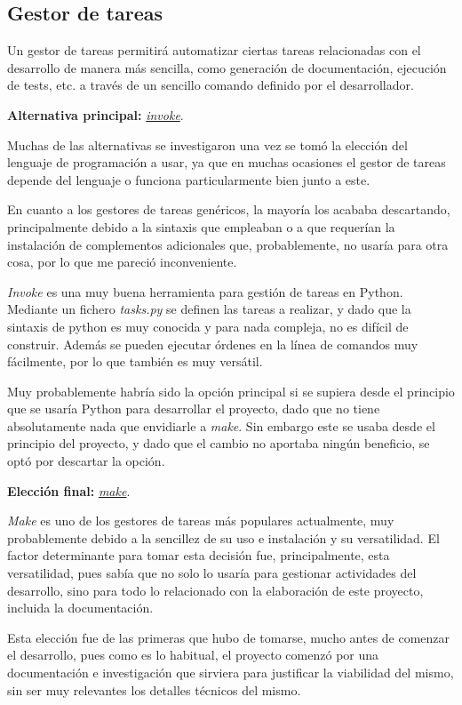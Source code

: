 \subsection{Gestor de tareas}

Un gestor de tareas permitirá automatizar ciertas tareas relacionadas con el desarrollo de manera más sencilla, como generación de documentación, ejecución de tests, etc. a través de un sencillo comando definido por el desarrollador.


\textbf{Alternativa principal:} \href{https://www.pyinvoke.org/}{\textit{invoke}}.

Muchas de las alternativas se investigaron una vez se tomó la elección del lenguaje de programación a usar, ya que en muchas ocasiones el gestor de tareas depende del lenguaje o funciona particularmente bien junto a este. 

En cuanto a los gestores de tareas genéricos, la mayoría los acababa descartando, principalmente debido a la sintaxis que empleaban o a que requerían la instalación de complementos adicionales que, probablemente, no usaría para otra cosa, por lo que me pareció inconveniente.

\textit{Invoke} es una muy buena herramienta para gestión de tareas en Python. Mediante un fichero \textit{tasks.py} se definen las tareas a realizar, y dado que la sintaxis de python es muy conocida y para nada compleja, no es difícil de construir. Además se pueden ejecutar órdenes en la línea de comandos muy fácilmente, por lo que también es muy versátil.

Muy probablemente habría sido la opción principal si se supiera desde el principio que se usaría Python para desarrollar el proyecto, dado que no tiene absolutamente nada que envidiarle a \textit{make}. Sin embargo este se usaba desde el principio del proyecto, y dado que el cambio no aportaba ningún beneficio, se optó por descartar la opción.

\textbf{Elección final:} \href{https://www.gnu.org/software/make/}{\textit{make}}.

\textit{Make} es uno de los gestores de tareas más populares actualmente, muy probablemente debido a la sencillez de su uso e instalación y su versatilidad. El factor determinante para tomar esta decisión fue, principalmente, esta versatilidad, pues sabía que no solo lo usaría para gestionar actividades del desarrollo, sino para todo lo relacionado con la elaboración de este proyecto, incluida la documentación.

Esta elección fue de las primeras que hubo de tomarse, mucho antes de comenzar el desarrollo, pues como es lo habitual, el proyecto comenzó por una documentación e investigación que sirviera para justificar la viabilidad del mismo, sin ser muy relevantes los detalles técnicos del mismo.

